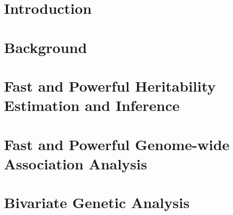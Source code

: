 \documentclass[11pt,a4paper]{report}      %
\begin{document}



\chapter{Introduction}

\chapter{Background}\label{ch:review}
%
\chapter{Fast and Powerful Heritability Estimation and Inference }
%

\chapter{Fast and Powerful Genome-wide Association Analysis}
%
\chapter{Bivariate Genetic Analysis}
%
\end{document}
